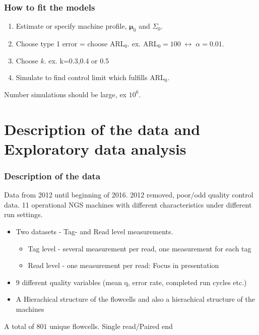 \documentclass[10pt]{beamer}\usepackage[]{graphicx}\usepackage[]{color}
\begin{document}
 
\begin{frame}\frametitle{How to fit the models}
\begin{enumerate}
\item Estimate or specify machine profile, $\boldsymbol{\mu}_0$ and $\Sigma_0$.
\item Choose type 1 error = choose ARL$_0$. ex. ARL$_0 = 100\; \leftrightarrow \; \alpha=0.01$.
\item Choose $k$. ex. k=0.3,0.4 or 0.5
\item Simulate to find control limit which fulfills ARL$_0$.
\end{enumerate}
Number simulations should be large, ex $10^6$. 

\end{frame}

\section[ Desc. of data + EDA]{Description of the data and Exploratory data analysis}
\begin{frame}\frametitle{Description of the data}
Data from 2012 until beginning of 2016. 2012 removed, poor/odd quality control data. 11 operational NGS machines with different characteristics under different run settings. 
\begin{itemize}
\item Two datasets - Tag- and Read level measurements. 
\begin{itemize}
\item Tag level - several measurement per read, one measurement for each tag 
\item Read level - one measurement per read: Focus in presentation
\end{itemize}
\item $9$ different quality variables (mean q, error rate, completed run cycles etc.)
\item A Hierachical structure of the flowcells and also a hierachical structure of the machines 
\end{itemize}
A total of $801$ unique flowcells. Single read/Paired end
\end{frame}
\end{document}
